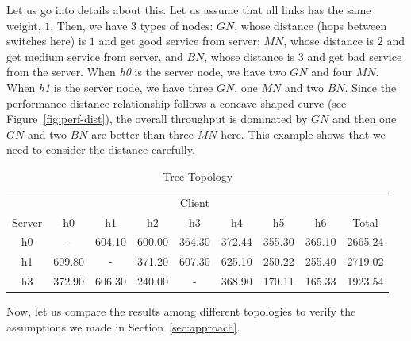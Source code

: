 Let us go into details about this. Let us assume that all links has the same weight, $1$. Then,
we have $3$ types of nodes: $GN$, whose distance (hops between switches here) is $1$ and get good service from server; $MN$,
whose distance is $2$ and get medium service from server, and $BN$, whose distance is $3$ and get
bad service from the server. When {\it h0} is the server node, we have two $GN$ and four $MN$. When {\it h1}
is the server node, we have three $GN$, one $MN$ and two $BN$. Since the performance-distance 
relationship follows a concave shaped curve (see Figure~\ref{fig:perf-dist}), 
the overall throughput is dominated by $GN$ and then one $GN$ and two $BN$ are 
better than three $MN$ here. This example shows that we need to consider the distance carefully.

\begin{table}
	\renewcommand{\arraystretch}{1.3}
	\caption{Tree Topology}
	\label{table:tree}
	\setlength\tabcolsep{4pt}
	\centering
	\begin{tabular}{|c||c|c|c|c|c|c|c||c|}
		\hline
		       & \multicolumn{7}{c||}{Client} &  \\ \hhline{|~||-------||~|}
		Server & h0 & h1 & h2 & h3 & h4 & h5 & h6 & Total\\
\hline\hline
h0 &    -     &  604.10  &  600.00  &  364.30  &  372.44  &  355.30  &  369.10  & 2665.24 \\
\hline
h1 &  609.80  &     -    &  371.20  &  607.30  &  625.10  &  250.22  &  255.40  & 2719.02 \\
\hline
h3 &  372.90  &  606.30  &  240.00  &     -    &  368.90  &  170.11  &  165.33  & 1923.54 \\
\hline
	\end{tabular}
\end{table}

Now, let us compare the results among different topologies to verify the assumptions 
we made in Section~\ref{sec:approach}.


